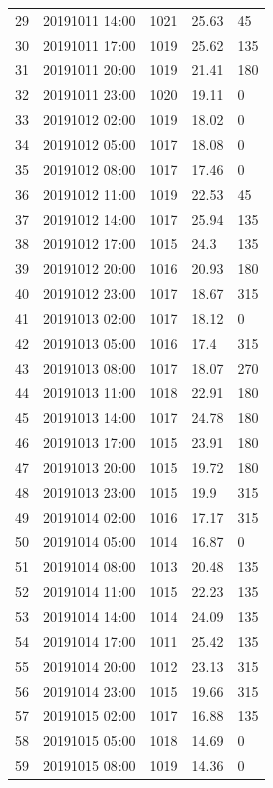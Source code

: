 \documentclass{article}\usepackage[]{graphicx}\usepackage[]{color}
\begin{document}
\begin{tabular}{rllll}
  29 & 20191011 14:00 & 1021 & 25.63 & 45 \\ 
  30 & 20191011 17:00 & 1019 & 25.62 & 135 \\ 
  31 & 20191011 20:00 & 1019 & 21.41 & 180 \\ 
  32 & 20191011 23:00 & 1020 & 19.11 & 0 \\ 
  33 & 20191012 02:00 & 1019 & 18.02 & 0 \\ 
  34 & 20191012 05:00 & 1017 & 18.08 & 0 \\ 
  35 & 20191012 08:00 & 1017 & 17.46 & 0 \\ 
  36 & 20191012 11:00 & 1019 & 22.53 & 45 \\ 
  37 & 20191012 14:00 & 1017 & 25.94 & 135 \\ 
  38 & 20191012 17:00 & 1015 & 24.3 & 135 \\ 
  39 & 20191012 20:00 & 1016 & 20.93 & 180 \\ 
  40 & 20191012 23:00 & 1017 & 18.67 & 315 \\ 
  41 & 20191013 02:00 & 1017 & 18.12 & 0 \\ 
  42 & 20191013 05:00 & 1016 & 17.4 & 315 \\ 
  43 & 20191013 08:00 & 1017 & 18.07 & 270 \\ 
  44 & 20191013 11:00 & 1018 & 22.91 & 180 \\ 
  45 & 20191013 14:00 & 1017 & 24.78 & 180 \\ 
  46 & 20191013 17:00 & 1015 & 23.91 & 180 \\ 
  47 & 20191013 20:00 & 1015 & 19.72 & 180 \\ 
  48 & 20191013 23:00 & 1015 & 19.9 & 315 \\ 
  49 & 20191014 02:00 & 1016 & 17.17 & 315 \\ 
  50 & 20191014 05:00 & 1014 & 16.87 & 0 \\ 
  51 & 20191014 08:00 & 1013 & 20.48 & 135 \\ 
  52 & 20191014 11:00 & 1015 & 22.23 & 135 \\ 
  53 & 20191014 14:00 & 1014 & 24.09 & 135 \\ 
  54 & 20191014 17:00 & 1011 & 25.42 & 135 \\ 
  55 & 20191014 20:00 & 1012 & 23.13 & 315 \\ 
  56 & 20191014 23:00 & 1015 & 19.66 & 315 \\ 
  57 & 20191015 02:00 & 1017 & 16.88 & 135 \\ 
  58 & 20191015 05:00 & 1018 & 14.69 & 0 \\ 
  59 & 20191015 08:00 & 1019 & 14.36 & 0 \\ 

\end{tabular}
\end{document}
